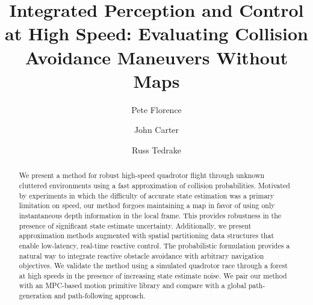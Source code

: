 \documentclass{llncs}
\begin{document}
\title{Integrated Perception and Control at High Speed: Evaluating Collision Avoidance Maneuvers Without Maps}
\author{Pete Florence \and John Carter \and Russ Tedrake }

\maketitle

\begin{abstract}
We present a method for robust high-speed quadrotor flight through unknown cluttered environments using a fast approximation of collision probabilities. Motivated by experiments in which the difficulty of accurate state estimation was a primary limitation on speed, our method forgoes maintaining a map in favor of using only instantaneous depth information in the local frame. This provides robustness in the presence of significant state estimate uncertainty. Additionally, we present approximation methods augmented with spatial partitioning data structures that enable low-latency, real-time reactive control. The probabilistic formulation provides a natural way to integrate reactive obstacle avoidance with arbitrary navigation objectives. We validate the method using a simulated quadrotor race through a forest at high speeds in the presence of increasing state estimate noise. We pair our method with an MPC-based motion primitive library and compare with a global path-generation and path-following approach.
\end{abstract}
\end{document}

